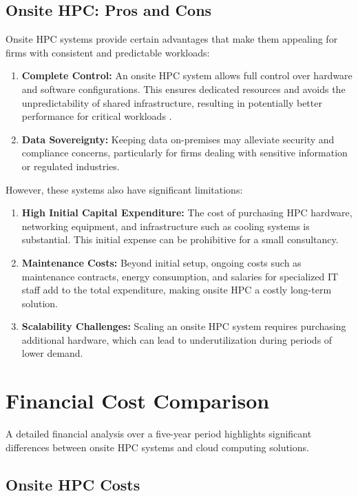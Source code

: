 \documentclass{article}
\begin{document}
\subsection{Onsite HPC: Pros and Cons}

Onsite HPC systems provide certain advantages that make them appealing for firms with consistent and predictable workloads:

\begin{enumerate}
    \item \textbf{Complete Control:} An onsite HPC system allows full control over hardware and software configurations. This ensures dedicated resources and avoids the unpredictability of shared infrastructure, resulting in potentially better performance for critical workloads \parencite{stergiou2018iot}.
    \item \textbf{Data Sovereignty:} Keeping data on-premises may alleviate security and compliance concerns, particularly for firms dealing with sensitive information or regulated industries.
\end{enumerate}

However, these systems also have significant limitations:

\begin{enumerate}
    \item \textbf{High Initial Capital Expenditure:} The cost of purchasing HPC hardware, networking equipment, and infrastructure such as cooling systems is substantial. This initial expense can be prohibitive for a small consultancy.
    \item \textbf{Maintenance Costs:} Beyond initial setup, ongoing costs such as maintenance contracts, energy consumption, and salaries for specialized IT staff add to the total expenditure, making onsite HPC a costly long-term solution.
    \item \textbf{Scalability Challenges:} Scaling an onsite HPC system requires purchasing additional hardware, which can lead to underutilization during periods of lower demand.
\end{enumerate}

\section{Financial Cost Comparison}

A detailed financial analysis over a five-year period highlights significant differences between onsite HPC systems and cloud computing solutions.

\subsection{Onsite HPC Costs}
\end{document}
